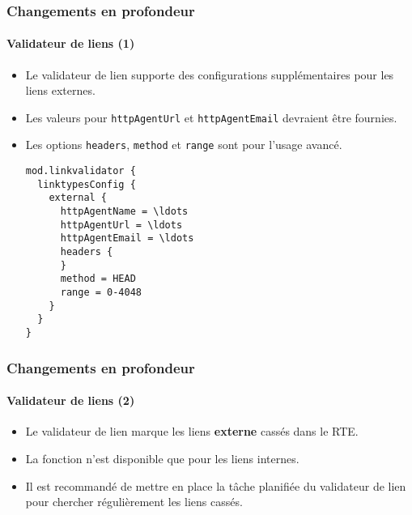 
\begin{frame}[fragile]
	\frametitle{Changements en profondeur}
	\framesubtitle{Validateur de liens (1)}

	\lstset{basicstyle=\tiny\ttfamily}

	\begin{itemize}
		\item Le validateur de lien supporte des configurations supplémentaires pour les liens externes.
		\item Les valeurs pour \texttt{httpAgentUrl} et \texttt{httpAgentEmail} devraient être fournies.
		\item Les options \texttt{headers}, \texttt{method} et \texttt{range} sont pour l'usage avancé.
\begin{lstlisting}
mod.linkvalidator {
  linktypesConfig {
    external {
      httpAgentName = \ldots
      httpAgentUrl = \ldots
      httpAgentEmail = \ldots
      headers {
      }
      method = HEAD
      range = 0-4048
    }
  }
}
\end{lstlisting}

	\end{itemize}

\end{frame}


\begin{frame}[fragile]
	\frametitle{Changements en profondeur}
	\framesubtitle{Validateur de liens (2)}

	\begin{itemize}
		\item Le validateur de lien marque les liens \textbf{externe} cassés dans le RTE\@.
		\item La fonction n'est disponible que pour les liens internes.
		\item Il est recommandé de mettre en place la tâche planifiée du validateur de lien pour
			chercher régulièrement les liens cassés.
	\end{itemize}

\end{frame}




